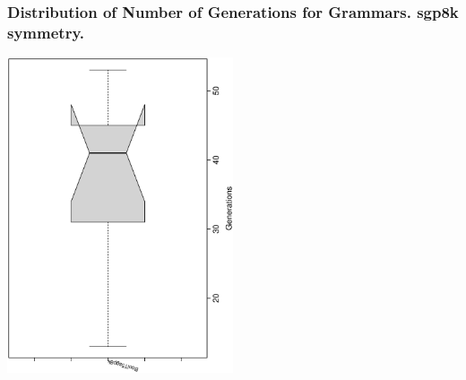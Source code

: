  \begin{frame}
 \frametitle{ Distribution of Number of Generations for Grammars. sgp8k  symmetry. }
 \begin{center}
\includegraphics[width=0.5\textwidth, angle=-90]
{ExpFboxplottGenerations006.eps}
 \end{center}
 \label{ExpFboxplottGenerations006.eps}  
 \end{frame}

